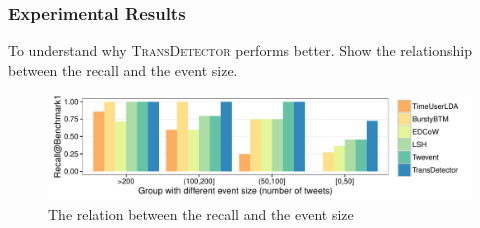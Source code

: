 \documentclass{beamer}
\begin{document}
\begin{frame}
\frametitle{Experimental Results}
To understand why \textsc{TransDetector} performs better.
\vfill
Show the relationship between the recall and the event size.
\begin{figure}[h]
	\setlength{\abovecaptionskip}{0.cm}
	\setlength{\belowcaptionskip}{0.cm}
        \centering
        \includegraphics[width=1.0\columnwidth]{../img/barchartOnBenchmark1.pdf}
        \caption{The relation between the recall and the event size}
        \label{fig:Benchmark1}
\end{figure}
\end{frame}
\end{document}
